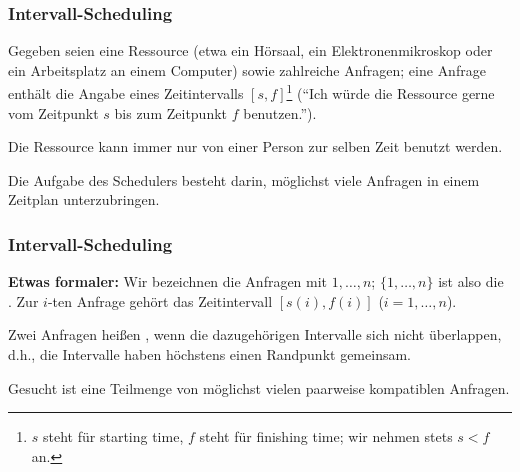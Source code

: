 \documentclass[smaller]{beamer}
\begin{document}
\begin{frame}
 \frametitle{Intervall-Scheduling}
 
Gegeben seien eine \alert{Ressource} (etwa ein Hörsaal, ein Elektronenmikroskop oder ein Arbeitsplatz an einem Computer) sowie zahlreiche Anfragen; eine \alert{Anfrage} enthält die Angabe eines Zeitintervalls $[s,f]$\footnote{$s$ steht für \alert{starting time}, $f$ steht für \alert{finishing time}; wir nehmen stets $s<f$ an.} (\enquote{Ich würde die Ressource gerne vom Zeitpunkt $s$ bis zum Zeitpunkt $f$ benutzen.}). \\ \vspace*{0.2cm}

Die Ressource kann immer nur von einer Person zur selben Zeit benutzt werden. \\ \vspace*{0.2cm}

Die Aufgabe des Schedulers besteht darin, möglichst viele Anfragen in einem Zeitplan unterzubringen.
\end{frame}

\begin{frame}
 \frametitle{Intervall-Scheduling}
 \textbf{Etwas formaler:} Wir bezeichnen die Anfragen mit $1,\ldots,n$; $\{ 1,\ldots,n \}$ ist also die . Zur $i$-ten Anfrage gehört das Zeitintervall $[s(i), f(i)]$ ($i=1,\ldots,n$). \\ \vspace*{0.2cm}
 
 Zwei Anfragen heißen , wenn die dazugehörigen Intervalle sich \alert{nicht überlappen}, d.h., die Intervalle haben höchstens einen Randpunkt gemeinsam. \\ \vspace*{0.2cm}
 
 \alert{Gesucht ist eine Teilmenge von möglichst vielen paarweise kompatiblen Anfragen}.
\end{frame}
\end{document}

